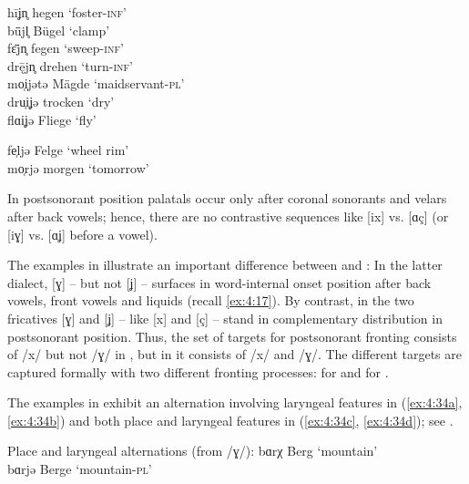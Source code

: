 \ex\label{ex:4:33b} hīʝn̥       \tab  [hiː.ʝn̩] \tab hegen \tab ‘foster-\textsc{inf}’   \\
    bǖjl̥       \tab  [byː.ʝl̩] \tab Bügel \tab ‘clamp’                 \\
    fɛ̄jn̥       \tab  [fɛː.ʝn̩] \tab fegen \tab ‘sweep-\textsc{inf}’    \\
    dr\={ę}jn̥  \tab  [drɛː.ʝn̩]  \tab  drehen  \tab ‘turn-\textsc{inf}’\\
    mo̜i̜jətə     \tab  Mägde   \tab ‘maidservant-\textsc{pl'}     \\
    dru̜i̜ʝə     \tab  [drʊɪ.ʝə]  \tab  trocken \tab ‘dry’              \\
    flɑi̜ʝə     \tab  [flɑɪ.ʝə]   \tab Fliege   \tab‘fly’               

\ex\label{ex:4:33c} fe̜ljə \tab [fɛl.ʝə] \tab  Felge  \tab ‘wheel rim’ \\
    mo̜rjə \tab [mɔr.ʝə] \tab  morgen \tab  ‘tomorrow’ 
   \z
\z 

In postsonorant position palatals occur only after coronal sonorants and velars after back vowels; hence, there are no contrastive sequences like [ix] vs. [ɑç] (or [iɣ] vs. [ɑʝ] before a vowel).

The examples in  illustrate an important difference between  and : In the latter dialect, [ɣ] -- but not [ʝ] -- surfaces in word-internal onset position after back vowels, front vowels and liquids (recall \ref{ex:4:17}). By contrast, in  the two fricatives [ɣ] and [ʝ] -- like [x] and [ç] -- stand in complementary distribution in postsonorant position. Thus, the set of targets for postsonorant fronting consists of /x/ but not /ɣ/ in , but in  it consists of /x/ and /ɣ/. The different targets are captured formally with two different fronting processes:  for  and  for .

The examples in  exhibit an alternation involving laryngeal features in (\ref{ex:4:34a}, \ref{ex:4:34b}) and both place and laryngeal features in (\ref{ex:4:34c}, \ref{ex:4:34d}); see \citet[34]{Dahlberg1937}.\largerpage[-2]

\ea\label{ex:4:34}%
Place and laryngeal alternations (from /ɣ/):
\ea\label{ex:4:34a}  bɑrχ  \tab [bɑrç]  \tab  Berg  \tab ‘mountain’  \\
     bɑrjə \tab [bɑrʝə] \tab  Berge \tab ‘mountain-\textsc{pl}’ 

